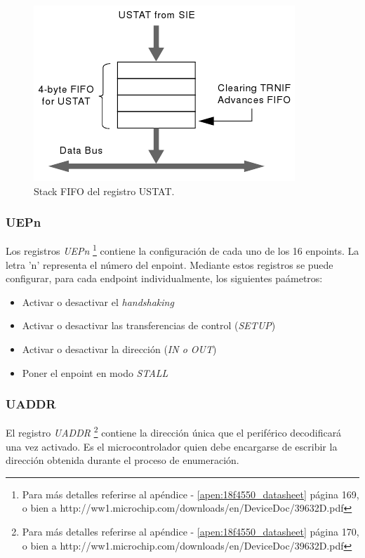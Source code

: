 \begin{figure}
\centering
\includegraphics[scale=0.6]{./img/ustat_fifo.png}
\caption{Stack FIFO del registro USTAT.}
\label{fig:ustat_fifo}
\end{figure}

\subsubsection{UEPn}
Los registros \emph{UEPn} \footnote{Para m\'as detalles referirse al
ap\'endice - \ref{apen:18f4550_datasheet} p\'agina 169, o bien a
http://ww1.microchip.com/downloads/en/DeviceDoc/39632D.pdf} contiene la
configuraci\'on de cada uno de los 16 enpoints. La letra 'n' representa el
n\'umero del enpoint.
Mediante estos registros se puede configurar, para cada endpoint
individualmente, los siguientes pa\'ametros:

\begin{itemize}
 \item Activar o desactivar el \emph{handshaking}

 \item Activar o desactivar las transferencias de control (\emph{SETUP})

 \item Activar o desactivar la direcci\'on (\emph{IN o OUT})

 \item Poner el enpoint en modo \emph{STALL}
\end{itemize}


\subsubsection{UADDR}
El registro \emph{UADDR} \footnote{Para m\'as detalles referirse al
ap\'endice - \ref{apen:18f4550_datasheet} p\'agina 170, o bien a
http://ww1.microchip.com/downloads/en/DeviceDoc/39632D.pdf} contiene la
direcci\'on \'unica que el perif\'erico decodificar\'a una vez activado. Es el
microcontrolador quien debe encargarse de escribir la direcci\'on obtenida
durante el proceso de enumeraci\'on.

